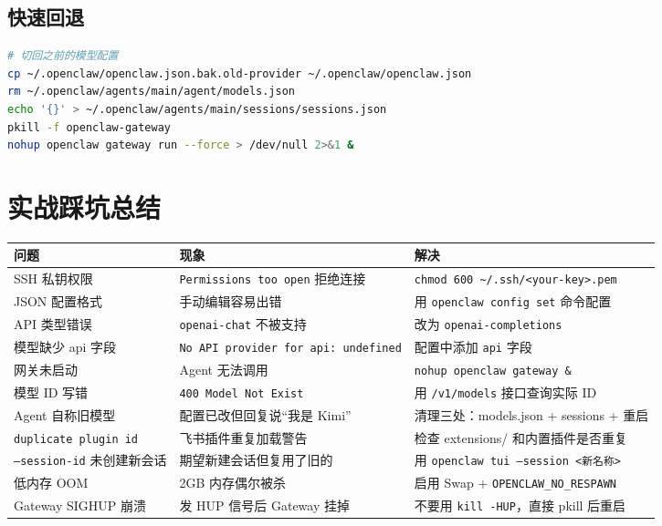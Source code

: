 \subsection{快速回退}


\begin{lstlisting}[language=bash]
# 切回之前的模型配置
cp ~/.openclaw/openclaw.json.bak.old-provider ~/.openclaw/openclaw.json
rm ~/.openclaw/agents/main/agent/models.json
echo '{}' > ~/.openclaw/agents/main/sessions/sessions.json
pkill -f openclaw-gateway
nohup openclaw gateway run --force > /dev/null 2>&1 &
\end{lstlisting}

\hrulefill

\section{实战踩坑总结}


\begin{table}[h]
\centering
\small
\begin{tabular}{|l|l|l|}
\hline
问题 & 现象 & 解决 \\
\hline
SSH 私钥权限 & \texttt{Permissions too open} 拒绝连接 & \texttt{chmod 600 \textasciitilde{}/.ssh/<your-key>.pem} \\
\hline
JSON 配置格式 & 手动编辑容易出错 & 用 \texttt{openclaw config set} 命令配置 \\
\hline
API 类型错误 & \texttt{openai-chat} 不被支持 & 改为 \texttt{openai-completions} \\
\hline
模型缺少 api 字段 & \texttt{No API provider for api: undefined} & 配置中添加 \texttt{api} 字段 \\
\hline
网关未启动 & Agent 无法调用 & \texttt{nohup openclaw gateway \&} \\
\hline
模型 ID 写错 & \texttt{400 Model Not Exist} & 用 \texttt{/v1/models} 接口查询实际 ID \\
\hline
Agent 自称旧模型 & 配置已改但回复说“我是 Kimi” & 清理三处：models.json + sessions + 重启 \\
\hline
\texttt{duplicate plugin id} & 飞书插件重复加载警告 & 检查 extensions/ 和内置插件是否重复 \\
\hline
\texttt{--session-id} 未创建新会话 & 期望新建会话但复用了旧的 & 用 \texttt{openclaw tui --session <新名称>} \\
\hline
低内存 OOM & 2GB 内存偶尔被杀 & 启用 Swap + \texttt{OPENCLAW\_NO\_RESPAWN} \\
\hline
Gateway SIGHUP 崩溃 & 发 HUP 信号后 Gateway 挂掉 & 不要用 \texttt{kill -HUP}，直接 pkill 后重启 \\
\hline
\end{tabular}
\end{table}

